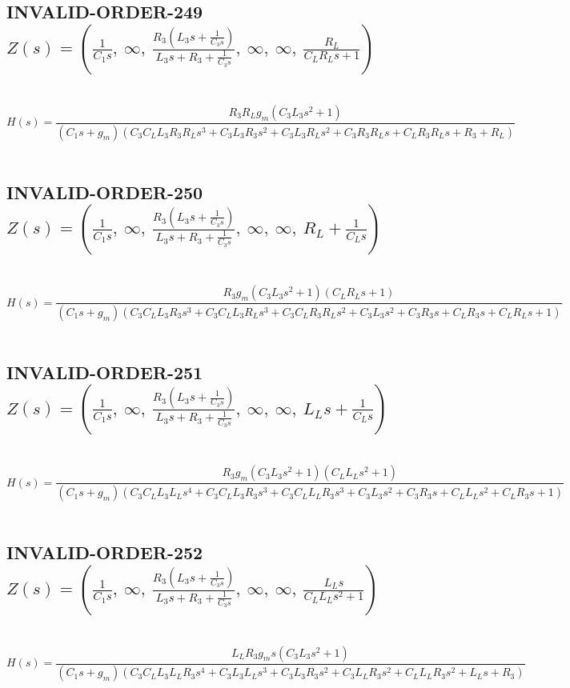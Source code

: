 \documentclass{article}
\begin{document}
\subsection{INVALID-ORDER-249 $Z(s) = \left( \frac{1}{C_{1} s}, \  \infty, \  \frac{R_{3} \left(L_{3} s + \frac{1}{C_{3} s}\right)}{L_{3} s + R_{3} + \frac{1}{C_{3} s}}, \  \infty, \  \infty, \  \frac{R_{L}}{C_{L} R_{L} s + 1}\right)$ } \ 
\textbf{\[H(s) = \frac{R_{3} R_{L} g_{m} \left(C_{3} L_{3} s^{2} + 1\right)}{\left(C_{1} s + g_{m}\right) \left(C_{3} C_{L} L_{3} R_{3} R_{L} s^{3} + C_{3} L_{3} R_{3} s^{2} + C_{3} L_{3} R_{L} s^{2} + C_{3} R_{3} R_{L} s + C_{L} R_{3} R_{L} s + R_{3} + R_{L}\right)}\] } \ 
\subsection{INVALID-ORDER-250 $Z(s) = \left( \frac{1}{C_{1} s}, \  \infty, \  \frac{R_{3} \left(L_{3} s + \frac{1}{C_{3} s}\right)}{L_{3} s + R_{3} + \frac{1}{C_{3} s}}, \  \infty, \  \infty, \  R_{L} + \frac{1}{C_{L} s}\right)$ } \ 
\textbf{\[H(s) = \frac{R_{3} g_{m} \left(C_{3} L_{3} s^{2} + 1\right) \left(C_{L} R_{L} s + 1\right)}{\left(C_{1} s + g_{m}\right) \left(C_{3} C_{L} L_{3} R_{3} s^{3} + C_{3} C_{L} L_{3} R_{L} s^{3} + C_{3} C_{L} R_{3} R_{L} s^{2} + C_{3} L_{3} s^{2} + C_{3} R_{3} s + C_{L} R_{3} s + C_{L} R_{L} s + 1\right)}\] } \ 
\subsection{INVALID-ORDER-251 $Z(s) = \left( \frac{1}{C_{1} s}, \  \infty, \  \frac{R_{3} \left(L_{3} s + \frac{1}{C_{3} s}\right)}{L_{3} s + R_{3} + \frac{1}{C_{3} s}}, \  \infty, \  \infty, \  L_{L} s + \frac{1}{C_{L} s}\right)$ } \ 
\textbf{\[H(s) = \frac{R_{3} g_{m} \left(C_{3} L_{3} s^{2} + 1\right) \left(C_{L} L_{L} s^{2} + 1\right)}{\left(C_{1} s + g_{m}\right) \left(C_{3} C_{L} L_{3} L_{L} s^{4} + C_{3} C_{L} L_{3} R_{3} s^{3} + C_{3} C_{L} L_{L} R_{3} s^{3} + C_{3} L_{3} s^{2} + C_{3} R_{3} s + C_{L} L_{L} s^{2} + C_{L} R_{3} s + 1\right)}\] } \ 
\subsection{INVALID-ORDER-252 $Z(s) = \left( \frac{1}{C_{1} s}, \  \infty, \  \frac{R_{3} \left(L_{3} s + \frac{1}{C_{3} s}\right)}{L_{3} s + R_{3} + \frac{1}{C_{3} s}}, \  \infty, \  \infty, \  \frac{L_{L} s}{C_{L} L_{L} s^{2} + 1}\right)$ } \ 
\textbf{\[H(s) = \frac{L_{L} R_{3} g_{m} s \left(C_{3} L_{3} s^{2} + 1\right)}{\left(C_{1} s + g_{m}\right) \left(C_{3} C_{L} L_{3} L_{L} R_{3} s^{4} + C_{3} L_{3} L_{L} s^{3} + C_{3} L_{3} R_{3} s^{2} + C_{3} L_{L} R_{3} s^{2} + C_{L} L_{L} R_{3} s^{2} + L_{L} s + R_{3}\right)}\] } \ 
\end{document}
